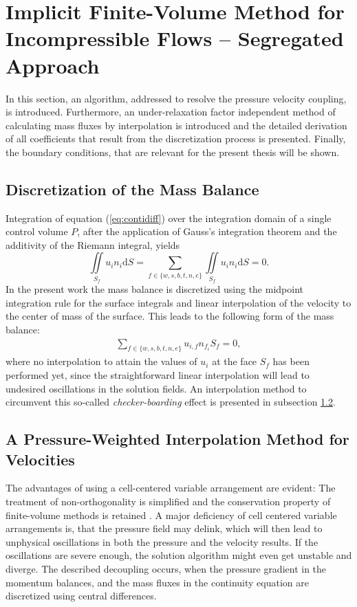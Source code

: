 \section{Implicit Finite-Volume Method for Incompressible Flows -- Segregated Approach}
\label{sec:seg}
In this section, an algorithm, addressed to resolve the pressure velocity coupling, is introduced. Furthermore, an under-relaxation factor independent method of calculating mass fluxes by interpolation is introduced and the detailed derivation of all coefficients that result from the discretization process is presented. Finally, the boundary conditions, that are relevant for the present thesis will be shown.

\subsection{Discretization of the Mass Balance}

Integration of equation (\ref{eq:contidiff}) over the integration domain of a single control volume \(P\), after the application of Gauss's integration theorem and the additivity of the Riemann integral, yields
\begin{displaymath}
  \iint\limits_{S_f} u_i n_i \mathrm{d}S = \sum_{f \in \{w,s,b,t,n,e\}} \iint\limits_{S_f} u_i n_{i} \mathrm{d}S = 0.
\end{displaymath}
In the present work the mass balance is discretized using the midpoint integration rule for the surface integrals and linear interpolation of the velocity to the center of mass of the surface. This leads to the following form of the mass balance:
\begin{align}
  \label{eq:massbalance}
  \sum_{f \in \{w,s,b,t,n,e\}} u_{i,f} n_{f_i} S_f = 0,
\end{align}
where no interpolation to attain the values of \(u_i\) at the face \(S_f\) has been performed yet, since the straightforward linear interpolation will lead to undesired oscillations in the solution fields. An interpolation method to circumvent this so-called \emph{checker-boarding} effect is presented in subsection \ref{sec:massflux}.

\subsection{A Pressure-Weighted Interpolation Method for Velocities}
\label{sec:massflux}

The advantages of using a cell-centered variable arrangement are evident: The treatment of non-orthogonality is simplified and the conservation property of finite-volume methods is retained \cite{choi99,majumdar88,miller88,zhang14}. A major deficiency of cell centered variable arrangements is, that the pressure field may delink, which will then lead to unphysical oscillations in both the pressure and the velocity results. If the oscillations are severe enough, the solution algorithm might even get unstable and diverge. The described decoupling occurs, when the pressure gradient in the momentum balances, and the mass fluxes in the continuity equation are discretized using central differences. 
  
